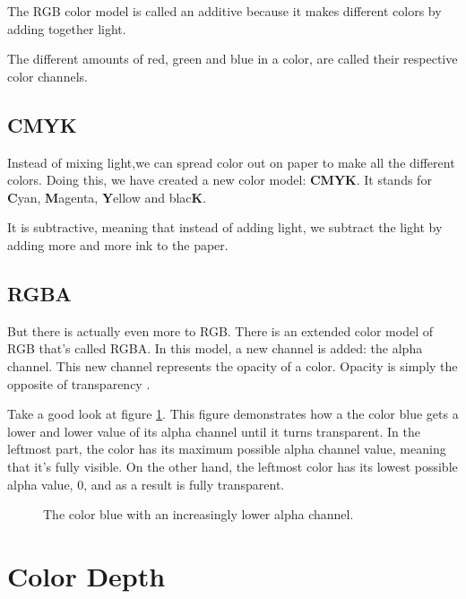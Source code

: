 \begin{refsection}
  The RGB color model is called an additive
  because it makes different colors by adding together light.

  The different amounts of red, green and blue in a color, are called
  their respective color channels.

  \subsection{CMYK}
  \label{sec:cmyk}

  Instead of mixing light,we can spread color out on paper to make all
  the different colors. Doing this, we have created a new color model:
  \textbf{CMYK}. It stands for \textbf{C}yan,
  \textbf{M}agenta, \textbf{Y}ellow and blac\textbf{K}.

  It is subtractive, meaning that
  instead of adding light, we subtract the light by adding more and
  more ink to the paper.

  \subsection{RGBA}

  But there is actually even more to RGB. There is an extended color
  model of RGB that's called RGBA. In this model, a new channel is
  added: the alpha channel. This new channel
  represents the opacity of a color. Opacity is simply the opposite of
  transparency \cite{porter84_compos_dig_img}.

  Take a good look at figure \ref{fig:alpha}. This figure demonstrates
  how a the color blue gets a lower and lower value of its alpha
  channel until it turns transparent. In the leftmost part, the color
  has its maximum possible alpha channel value, meaning that it's
  fully visible. On the other hand, the leftmost color has its lowest
  possible alpha value, $0$, and as a result is fully transparent.

  \begin{figure}
    \centering
    \caption{The color blue with an increasingly lower alpha channel.}
    \label{fig:alpha}
  \end{figure}

  \section{Color Depth}
  \label{sec:color-depth}


\end{refsection}
